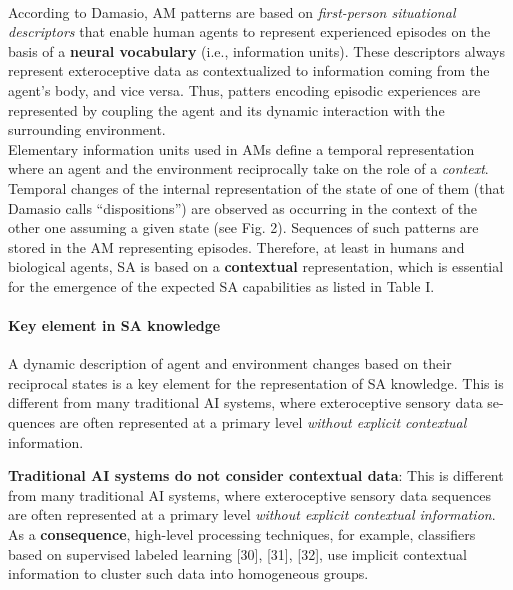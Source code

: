 \documentclass{article}
\begin{document}
			\paragraph{} According to Damasio, AM patterns are based on \emph{first-person situational descriptors} that enable human agents to represent experienced episodes on the basis of a \textbf{neural vocabulary} (i.e., information units). These descriptors always represent exteroceptive data as contextualized to information coming from the agent's body, and vice versa. Thus, patters encoding episodic experiences are represented by coupling the agent and its dynamic interaction with the surrounding environment.
			\\
			Elementary information units used in AMs define a temporal
			representation where an agent and the environment reciprocally take on the role of a \emph{context}. Temporal changes of
			the internal representation of the state of one of them (that
			Damasio calls “dispositions”) are observed as occurring in the
			context of the other one assuming a given state (see Fig. 2). Sequences of such patterns are stored in the AM representing
			episodes. Therefore, at least in humans and biological agents,
			SA is based on a \textbf{contextual} representation, which is essential
			for the emergence of the expected SA capabilities as listed in
			\citet{regazzoni-2020-multi-sensorial-generative-and-descriptive-self-awareness-models-for-autonomous-systems} Table I.
			
			\paragraph{Key element in SA knowledge}A dynamic description of agent and environment changes
			based on their reciprocal states is a key element for the
			representation of SA knowledge. This is different from many
			traditional AI systems, where exteroceptive sensory data se-
			quences are often represented at a primary level \emph{without explicit contextual} information. 
		
			\textbf{Traditional AI systems do not consider contextual data}: This is different from many
			traditional AI systems, where exteroceptive sensory data sequences are often represented at a primary level \emph{without explicit contextual information}. As a \textbf{consequence}, high-level
			processing techniques, for example, classifiers based on supervised labeled learning [30], [31], [32], use implicit contextual information to cluster such data into homogeneous groups.
			
\end{document}
